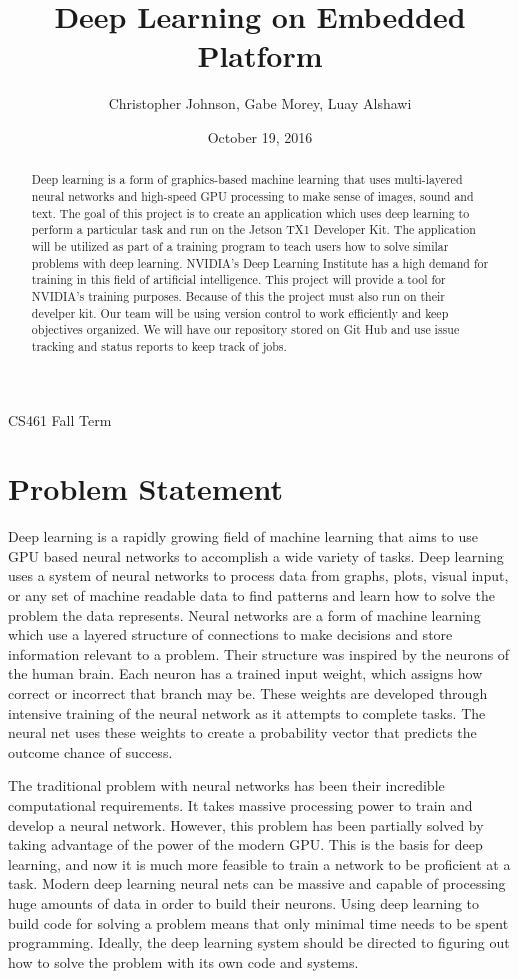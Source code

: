 \documentclass[letterpaper,10pt]{article}
\author{Christopher Johnson, Gabe Morey, Luay Alshawi}
\title{Deep Learning on Embedded Platform}
\date{October 19, 2016}
\begin{document}
\begin{titlingpage}
\maketitle
CS461 Fall Term
\begin{abstract}
Deep learning is a form of graphics-based machine learning that uses multi-layered neural networks and high-speed GPU processing to make sense of images, sound and text. The goal of this project is to create an application which uses deep learning to perform a particular task and run on the Jetson TX1 Developer Kit. The application will be utilized as part of a training program to teach users how to solve similar problems with deep learning. NVIDIA's Deep Learning Institute has a high demand for training in this field of artificial intelligence. This project will provide a tool for NVIDIA's training purposes. Because of this the project must also run on their develper kit. Our team will be using version control to work efficiently and keep objectives organized. We will have our repository stored on Git Hub and use issue tracking and status reports to keep track of jobs.
\end{abstract}
\end{titlingpage}

\section{Problem Statement}

Deep learning is a rapidly growing field of machine learning that aims to use GPU based neural networks to accomplish a wide variety of tasks.
Deep learning uses a system of neural networks to process data from graphs, plots, visual input, or any set of machine readable data to find patterns and learn how to solve the problem the data represents.
Neural networks are a form of machine learning which use a layered structure of connections to make decisions and store information relevant to a problem.
Their structure was inspired by the neurons of the human brain.
Each neuron has a trained input weight, which assigns how correct or incorrect that branch may be.
These weights are developed through intensive training of the neural network as it attempts to complete tasks.
The neural net uses these weights to create a probability vector that predicts the outcome chance of success.
 
The traditional problem with neural networks has been their incredible computational requirements.
It takes massive processing power to train and develop a neural network.
However, this problem has been partially solved by taking advantage of the power of the modern GPU.
This is the basis for deep learning, and now it is much more feasible to train a network to be proficient at a task.
Modern deep learning neural nets can be massive and capable of processing huge amounts of data in order to build their neurons.
Using deep learning to build code for solving a problem means that only minimal time needs to be spent programming.
Ideally, the deep learning system should be directed to figuring out how to solve the problem with its own code and systems.
 
\end{document}
